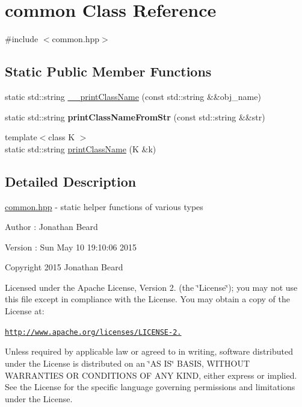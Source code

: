 \hypertarget{classcommon}{}\section{common Class Reference}
\label{classcommon}


{\ttfamily \#include $<$common.\+hpp$>$}

\subsection*{Static Public Member Functions}
\begin{DoxyCompactItemize}
\item 
static std\+::string \hyperlink{classcommon_a7ca2338596041e14a38de0f63d1c1e31}{\+\_\+\+\_\+print\+Class\+Name} (const std\+::string \&\&obj\+\_\+name)
\item 
\hypertarget{classcommon_aa84197a1f03508da476a68d11fe139d5}{}\label{classcommon_aa84197a1f03508da476a68d11fe139d5} 
static std\+::string {\bfseries print\+Class\+Name\+From\+Str} (const std\+::string \&\&str)
\item 
{\footnotesize template$<$class K $>$ }\\static std\+::string \hyperlink{classcommon_aec4b942352abd180c71fca2c0dbd70b7}{print\+Class\+Name} (K \&k)
\end{DoxyCompactItemize}


\subsection{Detailed Description}
\hyperlink{common_8hpp_source}{common.\+hpp} -\/ static helper functions of various types \begin{DoxyAuthor}{Author}
\+: Jonathan Beard 
\end{DoxyAuthor}
\begin{DoxyVersion}{Version}
\+: Sun May 10 19\+:10\+:06 2015
\end{DoxyVersion}
Copyright 2015 Jonathan Beard

Licensed under the Apache License, Version 2. (the \char`\"{}\+License\char`\"{}); you may not use this file except in compliance with the License. You may obtain a copy of the License at\+:

\href{http://www.apache.org/licenses/LICENSE-2.0}{\tt http\+://www.\+apache.\+org/licenses/\+L\+I\+C\+E\+N\+S\+E-\/2.}

Unless required by applicable law or agreed to in writing, software distributed under the License is distributed on an \char`\"{}\+A\+S I\+S\char`\"{} B\+A\+S\+IS, W\+I\+T\+H\+O\+UT W\+A\+R\+R\+A\+N\+T\+I\+ES OR C\+O\+N\+D\+I\+T\+I\+O\+NS OF A\+NY K\+I\+ND, either express or implied. See the License for the specific language governing permissions and limitations under the License. 

